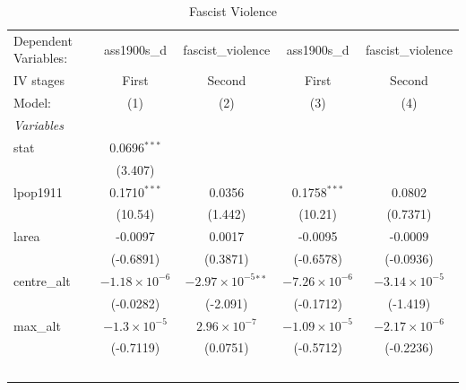 
\begin{table}[htbp]
   \caption{Fascist Violence}
   \centering
   \begin{tabular}{lcccc}
      \tabularnewline \midrule \midrule
      Dependent Variables:             & ass1900s\_d            & fascist\_violence             & ass1900s\_d            & fascist\_violence\\   
      IV stages                        & First                  & Second                        & First                  & Second \\   
      Model:                           & (1)                    & (2)                           & (3)                    & (4)\\  
      \midrule
      \emph{Variables}\\
      stat                             & 0.0696$^{***}$         &                               &                        &   \\   
                                       & (3.407)                &                               &                        &   \\   
      lpop1911                         & 0.1710$^{***}$         & 0.0356                        & 0.1758$^{***}$         & 0.0802\\   
                                       & (10.54)                & (1.442)                       & (10.21)                & (0.7371)\\   
      larea                            & -0.0097                & 0.0017                        & -0.0095                & -0.0009\\   
                                       & (-0.6891)              & (0.3871)                      & (-0.6578)              & (-0.0936)\\   
      centre\_alt                      & $-1.18\times 10^{-6}$  & $-2.97\times 10^{-5}$$^{**}$  & $-7.26\times 10^{-6}$  & $-3.14\times 10^{-5}$\\    
                                       & (-0.0282)              & (-2.091)                      & (-0.1712)              & (-1.419)\\   
      max\_alt                         & $-1.3\times 10^{-5}$   & $2.96\times 10^{-7}$          & $-1.09\times 10^{-5}$  & $-2.17\times 10^{-6}$\\    
                                       & (-0.7119)              & (0.0751)                      & (-0.5712)              & (-0.2236)\\   
$$
\end{tabular}
\end{table}
